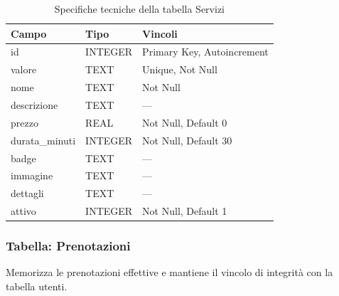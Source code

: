 \documentclass[12pt,a4paper]{article}
\begin{document}
\begin{table}[h!]
\centering
\vspace{0.4cm}
\begin{tabular}{lll}
    \toprule
    \textbf{Campo} & \textbf{Tipo} & \textbf{Vincoli} \\
    \midrule
    id             & INTEGER       & Primary Key, Autoincrement \\
    valore         & TEXT          & Unique, Not Null \\
    nome           & TEXT          & Not Null \\
    descrizione    & TEXT          & --- \\
    prezzo         & REAL          & Not Null, Default 0 \\
    durata\_minuti & INTEGER       & Not Null, Default 30 \\
    badge          & TEXT          & --- \\
    immagine       & TEXT          & --- \\
    dettagli       & TEXT          & --- \\
    attivo         & INTEGER       & Not Null, Default 1 \\
    \bottomrule
\end{tabular}
\caption{Specifiche tecniche della tabella Servizi}
\end{table}

\newpage

\subsubsection{Tabella: Prenotazioni}
Memorizza le prenotazioni effettive e mantiene il vincolo di integrità con la tabella utenti.
\end{document}
